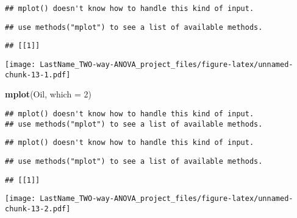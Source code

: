 \documentclass[]{article}
\newenvironment{Shaded}{\begin{snugshade}}{\end{snugshade}}
\newcommand{\DataTypeTok}[1]{\textcolor[rgb]{0.13,0.29,0.53}{#1}}
\newcommand{\DecValTok}[1]{\textcolor[rgb]{0.00,0.00,0.81}{#1}}
\newcommand{\KeywordTok}[1]{\textcolor[rgb]{0.13,0.29,0.53}{\textbf{#1}}}
\newcommand{\NormalTok}[1]{#1}
\newcommand{\OperatorTok}[1]{\textcolor[rgb]{0.81,0.36,0.00}{\textbf{#1}}}
\newcommand{\StringTok}[1]{\textcolor[rgb]{0.31,0.60,0.02}{#1}}
\begin{document}
\begin{verbatim}
## mplot() doesn't know how to handle this kind of input.
\end{verbatim}

\begin{verbatim}
## use methods("mplot") to see a list of available methods.
\end{verbatim}

\begin{verbatim}
## [[1]]
\end{verbatim}

\texttt{[image: LastName\_TWO-way-ANOVA\_project\_files/figure-latex/unnamed-chunk-13-1.pdf]}

\begin{Shaded}
\begin{Highlighting}[]
\KeywordTok{mplot}\NormalTok{(Oil, }\DataTypeTok{which =} \DecValTok{2}\NormalTok{)}
\end{Highlighting}
\end{Shaded}

\begin{verbatim}
## mplot() doesn't know how to handle this kind of input.
## use methods("mplot") to see a list of available methods.
\end{verbatim}

\begin{verbatim}
## mplot() doesn't know how to handle this kind of input.
\end{verbatim}

\begin{verbatim}
## use methods("mplot") to see a list of available methods.
\end{verbatim}

\begin{verbatim}
## [[1]]
\end{verbatim}

\texttt{[image: LastName\_TWO-way-ANOVA\_project\_files/figure-latex/unnamed-chunk-13-2.pdf]}

\begin{Shaded}
\end{Shaded}
\end{document}
